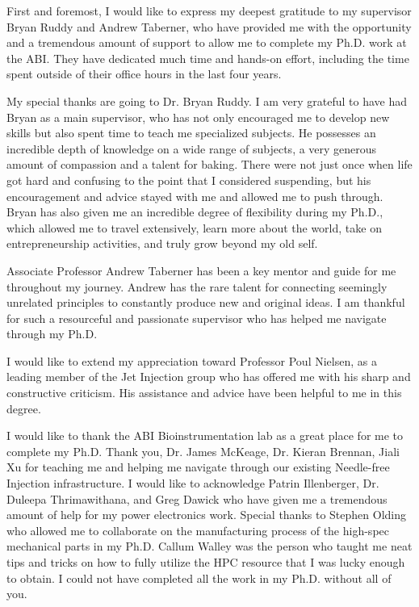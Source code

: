 \begin{acknowledgements}


    First and foremost, I would like to express my deepest gratitude to my supervisor Bryan Ruddy and Andrew Taberner, who have provided me with the opportunity and a tremendous amount of support to allow me to complete my Ph.D. work at the ABI. They have dedicated much time and hands-on effort, including the time spent outside of their office hours in the last four years.
    
    
    My special thanks are going to Dr. Bryan Ruddy. I am very
    grateful to have had Bryan as a main supervisor, who has not only encouraged me to develop new skills but also spent time to teach me specialized subjects. He possesses an incredible depth of knowledge on a wide range of subjects, a very generous amount of compassion and a talent for baking. There were not just once when life got hard and confusing to the point that I considered suspending, but his encouragement and advice stayed with me and allowed me to push through. Bryan has also given me an incredible degree of flexibility during my Ph.D., which allowed me to travel extensively, learn more about the world, take on entrepreneurship activities, and truly grow beyond my old self.
    
    
    Associate Professor Andrew Taberner has been a key mentor and guide for me throughout my journey. Andrew has the rare talent for connecting seemingly unrelated principles to constantly produce new and original ideas. I am thankful for such a resourceful and passionate supervisor who has helped me navigate through my Ph.D.
    
    
    I would like to extend my appreciation toward Professor Poul Nielsen, as a leading member of the Jet Injection group who has offered me with his sharp and constructive criticism. His assistance and advice have been helpful to me in this degree.
    
    
    I would like to thank the ABI Bioinstrumentation lab as a great place for me to complete my Ph.D. Thank you, Dr. James McKeage, Dr. Kieran Brennan, Jiali Xu for teaching me and helping me navigate through our existing Needle-free Injection infrastructure. I would like to acknowledge Patrin Illenberger, Dr. Duleepa Thrimawithana, and Greg Dawick who have given me a tremendous amount of help for my power electronics work. Special thanks to Stephen Olding who allowed me to collaborate on the manufacturing process of the high-spec mechanical parts in my Ph.D. Callum Walley was the person who taught me neat tips and tricks on how to fully utilize the HPC resource that I was lucky enough to obtain. I could not have completed all the work in my Ph.D. without all of you. 
    

\end{acknowledgements}
